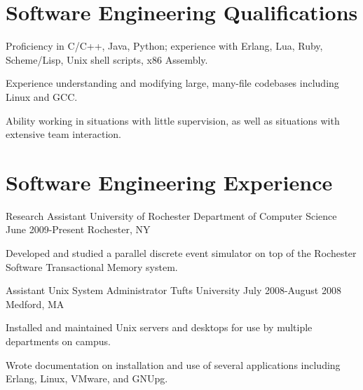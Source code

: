 \documentclass[letterpaper]{resume}
\author{Gregory Wilbur}
\begin{document}
\maketitle

\section{Software Engineering Qualifications}
\vspace{\secskip}

\begin{compactitem}
	\item Proficiency in C/C++, Java, Python; experience with Erlang, Lua, Ruby, Scheme/Lisp, Unix shell scripts, x86 Assembly. \par
	\item Experience understanding and modifying large, many-file codebases including Linux and GCC.\par
	\item Ability working in situations with little supervision, as well as situations with extensive team interaction. \par
\end{compactitem}

\section{Software Engineering Experience}

\affiliation
{Research Assistant}
{University of Rochester Department of Computer Science}
{June 2009-Present}
{Rochester, NY}

\begin{compactitem}
	\item Developed and studied a parallel discrete event simulator on top of the Rochester Software Transactional Memory system. \par
\end{compactitem}

\affiliation
{Assistant Unix System Administrator}
{Tufts University}
{July 2008-August 2008}
{Medford, MA}

\begin{compactitem}
	\item Installed and maintained Unix servers and desktops for use by multiple departments on campus. \par
	\item Wrote documentation on installation and use of several applications including Erlang, Linux, VMware, and GNUpg. \par
\end{compactitem}
\end{document}
